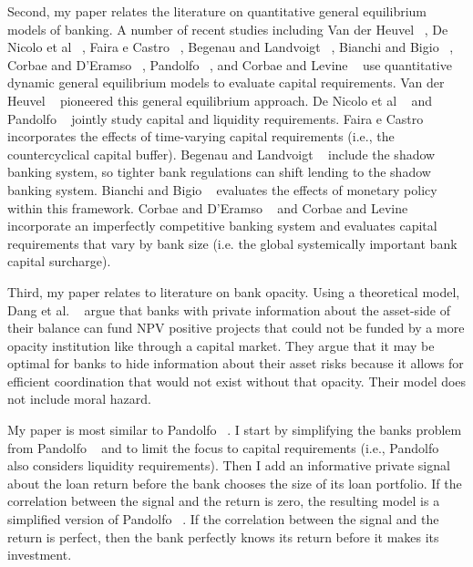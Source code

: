 \documentclass[12pt]{article}
\begin{document}
Second, my paper relates the literature on quantitative general equilibrium models of banking.  A number of recent studies including Van der Heuvel ~\cite{vandenheuvel_2008}, De Nicolo et al ~\cite{denicolo_2014}, Faira e Castro ~\cite{fariaecastro_2020}, Begenau and Landvoigt ~\cite{begenau_landvoigt_2021}, Bianchi and Bigio ~\cite{bianchi_bigio_2021}, Corbae and D'Eramso ~\cite{corbae_derasmo_2021}, Pandolfo ~\cite{pandolfo_2021}, and Corbae and Levine ~\cite{corbae_levine_2022} use quantitative dynamic general equilibrium models to evaluate capital requirements.  Van der Heuvel ~\cite{vandenheuvel_2008} pioneered this general equilibrium approach.  De Nicolo et al ~\cite{denicolo_2014} and Pandolfo ~\cite{pandolfo_2021} jointly study capital and liquidity requirements. Faira e Castro ~\cite{fariaecastro_2020} incorporates the effects of time-varying capital requirements (i.e., the countercyclical capital buffer).  Begenau and Landvoigt ~\cite{begenau_landvoigt_2021} include the shadow banking system, so tighter bank regulations can shift lending to the shadow banking system. Bianchi and Bigio ~\cite{bianchi_bigio_2021} evaluates the effects of monetary policy within this framework. Corbae and D'Eramso ~\cite{corbae_derasmo_2021} and Corbae and Levine ~\cite{corbae_levine_2022} incorporate an imperfectly competitive banking system and evaluates capital requirements that vary by bank size (i.e. the global systemically important bank capital surcharge).

\bigskip

Third, my paper relates to literature on bank opacity.  Using a theoretical model, Dang et al. ~\cite{dang_2017} argue that banks with private information about the asset-side of their balance can fund NPV positive projects that could not be funded by a more opacity institution like through a capital market.  They argue that it may be optimal for banks to hide information about their asset risks because it allows for efficient coordination that would not exist without that opacity. Their model does not include moral hazard.

\bigskip

My paper is most similar to Pandolfo ~\cite{pandolfo_2021}. I start by simplifying the banks problem from Pandolfo ~\cite{pandolfo_2021} and to limit the focus to capital requirements (i.e., Pandolfo ~\cite{pandolfo_2021} also considers liquidity requirements). Then I add an informative private signal about the loan return before the bank chooses the size of its loan portfolio. If the correlation between the signal and the return is zero, the resulting model is a simplified version of Pandolfo ~\cite{pandolfo_2021}.  If the correlation between the signal and the return is perfect, then the bank perfectly knows its return before it makes its investment.
\end{document}
